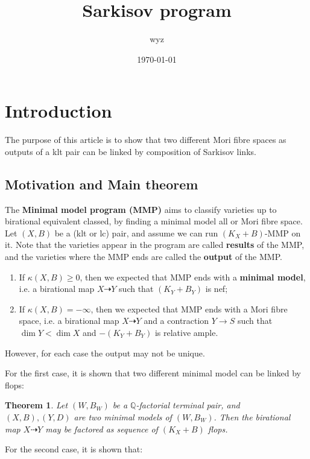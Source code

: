\documentclass{article}
\title{Sarkisov program}
\author{wyz}
\date{\today}
\newtheorem{thm}[defn]{Theorem}
\begin{document}
  \maketitle
  \tableofcontents
\section{Introduction}

The purpose of this article is to show that two different Mori fibre spaces as outputs of a klt pair can be linked by composition of  Sarkisov links.



\subsection{Motivation and Main theorem}
The \textbf{Minimal model program (MMP)}  aims to classify varieties up to birational equivalent classed, by finding a minimal model all or Mori fibre space. Let $ \left(X,B\right) $ be a (klt or lc) pair, and assume we can run $ (K_X+B)$-MMP on it. Note that the varieties appear in the program are called \textbf{results} of the MMP, and the varieties where the MMP ends are called the \textbf{output} of the MMP.
\begin{enumerate}
  \item If $\kappa(X,B)\geqslant 0$, then we expected that MMP ends with a \textbf{minimal model}, i.e. a birational map $X \dashrightarrow Y$ such that $(K_Y+B_Y)$ is nef;
  \item If $\kappa(X,B)= -\infty$, then we expected that MMP ends with a Mori fibre space, i.e. a birational map $X \dashrightarrow Y$ and a contraction $Y\to S$ such that $\dim Y<\dim X$ and $-(K_Y+B_Y)$ is relative ample.
\end{enumerate}
However, for each case the output may not be unique.

For the first case, it is shown that two different minimal model can be linked by flops:
\begin{thm}
  \cite[Theorem 1]{kawamataFlopsConnectMinimal2008} Let $(W,B_W)$ be a $\mathbb{Q}$-factorial terminal pair, and $(X,B),(Y,D)$ are two minimal models of $(W,B_W)$. Then the birational map $X\dashrightarrow Y$ may be factored as sequence of $(K_X+B)$ flops. 
\end{thm}
For the second case, it is shown that:
\end{document}
